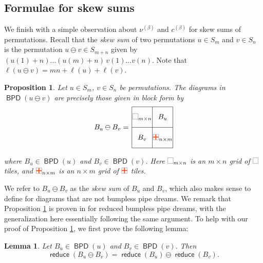 \documentclass[11pt]{article}
\newtheorem{proposition}[theo]{Proposition}
\newtheorem{lemma}[theo]{Lemma}
\theoremstyle{definition}
\numberwithin{equation}{section}
\DeclareMathOperator{\reduce}{\mathsf{reduce}}
\DeclareMathOperator{\BPD}{\mathsf{BPD}}
\newcommand{\pipecolor}{UForange}
\newcommand{\tilescale}{0.27}
\newcommand{\drawSquare}{
    \draw[
        xshift=0.5cm,yshift=0.5cm,
        black,opacity=0.5,thin
    ] (0,0) rectangle (1,1);
}
\newcommand{\drawHorizontal}[2]{
    \draw[color=\pipecolor,very thick]
    (#1-0.5,#2) to (#1+0.5,#2);
}
\newcommand{\drawVertical}[2]{
    \draw[color=\pipecolor,very thick]
    (#1,#2-0.5) to (#1,#2+0.5);
}
\newcommand{\drawCross}[2]{
    \drawHorizontal{#1}{#2}
    \drawVertical{#1}{#2}
}
\newcommand{\blank}[1][scale=\tilescale,baseline=4pt]{
    \begin{tikzpicture}[#1]
    \drawSquare
    \end{tikzpicture}
}
\newcommand{\cross}[1][scale=\tilescale,baseline=4pt]{
    \begin{tikzpicture}[#1]
    \drawSquare
    \drawCross11
    \end{tikzpicture}
}
\begin{document}
\subsection{Formulae for skew sums}

We finish with a simple observation about $\nu^{(\beta)}$ and $c^{(\beta)}$ for skew sums of permutations.
Recall that the \textit{skew sum} of two permutations $u\in S_m$ and $v\in S_n$ is the permutation $u\ominus v\in S_{m+n}$ given by $(u(1)+n)\dots (u(m)+n)\, v(1)\dots v(n)$.
Note that $\ell(u\ominus v) = mn + \ell(u) + \ell(v)$.

\begin{proposition}
\label{prop:skew_BPD}
Let $u\in S_m$, $v\in S_n$ be permutations.
The diagrams in $\BPD(u\ominus v)$ are precisely those given in block form by
\[
    \begin{tikzpicture}
        \node at (-1.5,-0.5) {$B_u\ominus B_v =$};
        \draw[
            step=1.0,xshift=-0.5cm,yshift=0.5cm,
            black,thin
        ] (0,0) grid (2,-2);
        \node at (0,0) {$\blank_{m\times n}$};
        \node at (1,0) {$B_u$};
        \node at (0,-1) {$B_v$};
        \node at (1,-1) {$\cross_{n\times m}$};
    \end{tikzpicture}
\]
where $B_u\in \BPD(u)$ and $B_v\in \BPD(v)$.
Here $\blank_{m\times n}$ is an $m\times n$ grid of $\blank$ tiles, and $\cross_{n\times m}$ is an $n\times m$ grid of $\cross$ tiles.
\end{proposition}

We refer to $B_u\ominus B_v$ as the \textit{skew sum} of $B_u$ and $B_v$, which also makes sense to define for diagrams that are not bumpless pipe dreams.
We remark that Proposition \ref{prop:skew_BPD} is proven in \cite{HPS22} for reduced bumpless pipe dreams, with the generalization here essentially following the same argument.
To help with our proof of Proposition \ref{prop:skew_BPD}, we first prove the following lemma:

\begin{lemma}
\label{lem:skew_reduce}
    Let $B_u\in \BPD(u)$ and $B_v\in \BPD(v)$.
    Then \[
        \reduce(B_u\ominus B_v)
        = \reduce(B_u)\ominus \reduce(B_v).
    \]
\end{lemma}
\end{document}
